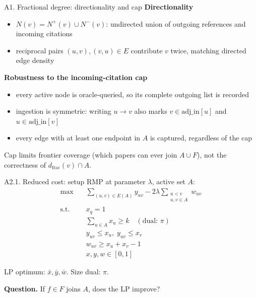 \documentclass{beamer}
\begin{document}
\begin{frame}{A1. Fractional degree: directionality and cap}
  \textbf{Directionality}
  \begin{itemize}
    \item $N(v) = N^+(v) \cup N^-(v)$: undirected union of outgoing references and incoming citations
    \item reciprocal pairs $(u,v),(v,u) \in E$ contribute $v$ twice, matching directed edge density
  \end{itemize}

  \vfill

  \textbf{Robustness to the incoming-citation cap}
  \begin{itemize}
    \item every active node is oracle-queried, so its complete outgoing list is recorded
    \item ingestion is symmetric: writing $u \to v$ also marks $v \in \text{adj\_in}[u]$ and $u \in \text{adj\_in}[v]$
    \item every edge with at least one endpoint in $A$ is captured, regardless of the cap
  \end{itemize}

  \vfill

  Cap limits frontier coverage (which papers can ever join $A \cup F$), not the correctness of $d_{\mathrm{frac}}(v) \cap A$.
\end{frame}


\begin{frame}{A2.1. Reduced cost: setup}
  RMP at parameter $\lambda$, active set $A$:
  \begin{align*}
    \max \quad        & \sum_{(u,v)\in E(A)} y_{uv} - 2\lambda \sum_{\substack{u<v\\u,v\in A}} w_{uv} \\
    \text{s.t.} \quad & x_q = 1                                                                       \\
                      & \sum_{u\in A} x_u \ge k \quad (\text{dual: } \pi)                             \\
                      & y_{uv} \le x_u,\; y_{uv} \le x_v                                              \\
                      & w_{uv} \ge x_u + x_v - 1                                                      \\
                      & x,y,w \in [0,1]
  \end{align*}

  LP optimum: $\bar{x}, \bar{y}, \bar{w}$. Size dual: $\pi$.

  \vfill

  \textbf{Question.} If $f \in F$ joins $A$, does the LP improve?
\end{frame}
\end{document}
